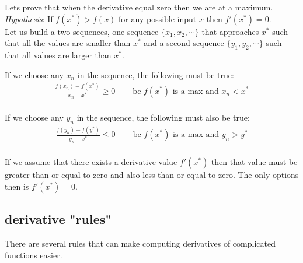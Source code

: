 Lets prove that when the derivative equal zero then we are at a maximum. 
\textit{Hypothesis}: If $f(x^{*}) > f(x)$ for any possible input $x$ then  $f'(x^{*})=0$.\\

Let us build a two sequences, one sequence $\{x_{1}, x_{2}, \cdots \}$ that approaches $x^{*}$ such that all the values are smaller than $x^{*}$ and a second sequence $\{y_{1}, y_{2}, \cdots \}$ such that all values are larger than $x^{*}$.

If we choose any $x_{n}$ in the sequence, the following must be true:
\begin{align}
    \frac{f(x_{n}) - f(x^{*})}{x_{n}-x^{*}} \geq 0 & \;\; &\text{bc $f(x^{*})$ is a max and } x_{n}< x^{*} \\ 
\end{align}

If we choose any $y_{n}$ in the sequence, the following must also be true:
\begin{align}
    \frac{f(y_{n}) - f(y^{*})}{y_{n}-x^{*}} \leq 0 & \;\; &\text{bc $f(x^{*})$ is a max and } y_{n}>y^{*} \\ 
\end{align}

If we assume that there exists a derivative value $f'(x^{*})$ then that value must be greater than or equal to zero and also less than or equal to zero. 
The only options then is $f'(x^{*}) = 0$.


\subsection{derivative "rules"}

There are several rules that can make computing derivatives of complicated functions easier. 

